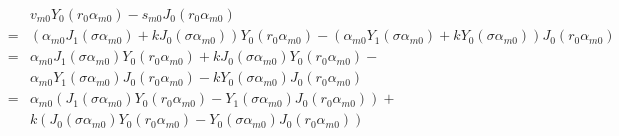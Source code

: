 \documentclass{article}
\begin{document}
\begin{eqnarray}
    & & v_{m0}Y_0(r_0\alpha_{m0}) - s_{m0}J_0(r_0\alpha_{m0})
    \nonumber\\
    &=& (\alpha_{m0}J_1(\sigma\alpha_{m0}) + kJ_0(\sigma\alpha_{m0})) Y_0(r_0\alpha_{m0}) -
        (\alpha_{m0}Y_1(\sigma\alpha_{m0}) + kY_0(\sigma\alpha_{m0})) J_0(r_0\alpha_{m0})
    \nonumber\\
    &=& \alpha_{m0}J_1(\sigma\alpha_{m0}) Y_0(r_0\alpha_{m0}) + kJ_0(\sigma\alpha_{m0}) Y_0(r_0\alpha_{m0}) -
    \nonumber\\
    & & \alpha_{m0}Y_1(\sigma\alpha_{m0}) J_0(r_0\alpha_{m0}) - kY_0(\sigma\alpha_{m0}) J_0(r_0\alpha_{m0})
    \nonumber\\
    &=& \alpha_{m0}(J_1(\sigma\alpha_{m0}) Y_0(r_0\alpha_{m0}) - Y_1(\sigma\alpha_{m0}) J_0(r_0\alpha_{m0})) +
    \nonumber\\
    & & k(J_0(\sigma\alpha_{m0}) Y_0(r_0\alpha_{m0}) - Y_0(\sigma\alpha_{m0}) J_0(r_0\alpha_{m0}))
\end{eqnarray}
\end{document}
